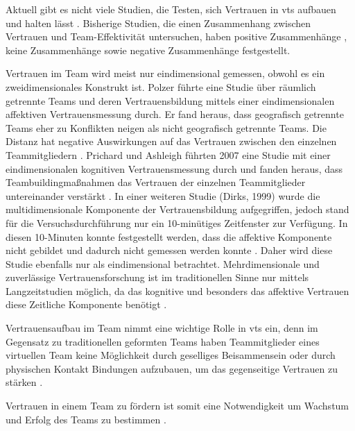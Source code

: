 \documentclass[a4paper,11pt]{article}%
\renewcommand{\\}{\vspace*{0.5\baselineskip} \newline}
\begin{document}
Aktuell gibt es nicht viele Studien, die Testen, sich Vertrauen in \ac{vts} aufbauen und halten lässt \citep[p.8-23]{duarte2006mastering}.
Bisherige Studien, die einen Zusammenhang zwischen Vertrauen und Team-Effektivität untersuchen, haben positive Zusammenhänge \citep{davis2000trusted}, keine Zusammenhänge \citep{hertel2004managing} sowie negative Zusammenhänge \citep{dirks1999effects} festgestellt.

Vertrauen im Team wird meist nur eindimensional gemessen, obwohl es ein zweidimensionales Konstrukt ist.
Polzer führte eine Studie über räumlich getrennte Teams und deren Vertrauensbildung mittels einer eindimensionalen affektiven Vertrauensmessung durch. Er fand heraus, dass geografisch getrennte Teams eher zu Konflikten neigen als nicht geografisch getrennte Teams. Die Distanz hat negative Auswirkungen auf das Vertrauen zwischen den einzelnen Teammitgliedern \citep[p.682]{polzer2006extending}.
Prichard und Ashleigh führten 2007 eine Studie mit einer eindimensionalen kognitiven Vertrauensmessung durch und fanden heraus, dass Teambuildingmaßnahmen das Vertrauen der einzelnen Teammitglieder untereinander verstärkt \citep[p.704]{prichard2007effects}.
In einer weiteren Studie (Dirks, 1999) wurde die multidimensionale Komponente der Vertrauensbildung aufgegriffen, jedoch stand für die Versuchsdurchführung nur ein 10-minütiges Zeitfenster zur Verfügung. In diesen 10-Minuten konnte festgestellt werden, dass die affektive Komponente nicht gebildet und dadurch nicht gemessen werden konnte \citep[p.445]{mayer1995integrative}. Daher wird diese Studie ebenfalls nur als eindimensional betrachtet.
Mehrdimensionale und zuverlässige Vertrauensforschung ist im traditionellen Sinne nur mittels Langzeitstudien möglich, da das kognitive und besonders das affektive Vertrauen diese Zeitliche Komponente benötigt \citep{jones1998experience}.

Vertrauensaufbau im Team nimmt eine wichtige Rolle in \ac{vts} ein, denn im Gegensatz zu traditionellen geformten Teams haben Teammitglieder eines virtuellen Team keine Möglichkeit durch geselliges Beisammensein oder durch physischen Kontakt Bindungen aufzubauen, um das gegenseitige Vertrauen zu stärken \citep{TrustAndTheVirtualOrganisation}.

Vertrauen in einem Team zu fördern ist somit eine Notwendigkeit um Wachstum und Erfolg des Teams zu bestimmen \citep{glacel1997teamwork}.
\end{document}
